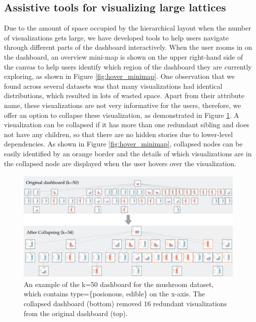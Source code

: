 \subsection{Assistive tools for visualizing large lattices\label{sec:navigation}}
Due to the amount of space occupied by the hierarchical layout when the number of visualizations gets large, we have developed tools to help users navigate through different parts of the dashboard interactively. 
  When the user zooms in on the dashboard, an overview mini-map is shown on the upper right-hand side of the canvas to help users identify which region of the dashboard they are currently exploring, as shown in Figure \ref{fig:hover_minimap}. 
One observation that we found across several datasets was that many visualizations had identical distributions, which resulted in lots of wasted space. Apart from their attribute name, these visualizations are not very informative for the users, therefore, we offer an option to collapse these visualization, as demonstrated in Figure \ref{fig:collapse_demo}. A visualization can be collapsed if it has more than one redundant sibling and does not have any children, so that there are no hidden stories due to lower-level dependencies. As shown in Figure \ref{fig:hover_minimap}, collapsed nodes can be easily identified by an orange border and the details of which visualizations are in the collapsed node are displayed when the user hovers over the visualization.
\begin{figure}[ht!]
\centering
\includegraphics[width=\linewidth]{figures/collapsed_example.png}
\caption{An example of the k=50 dashboard for the mushroom dataset\cite{mushroom}, which contains type=\{posionous, edible\} on the x-axis. The collapsed dashboard (bottom) removed 16 redundant visualizations from the original dashboard (top).}
\label{fig:collapse_demo}
\end{figure}

